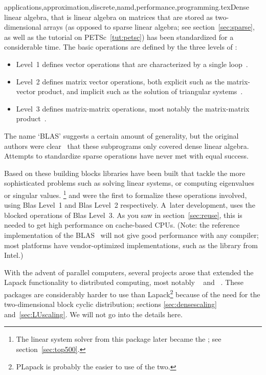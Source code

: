 {applications,approximation,discrete,namd,performance,programming}.texDense linear algebra, that is linear algebra on matrices that are
stored as two-dimensional arrays (as opposed to sparse linear algebra;
see section~\ref{sec:sparse}, as well as the
tutorial on PETSc~\ref{tut:petsc}) has been standardized for a
considerable time. The basic operations are defined by the three
levels of :
\begin{itemize}
\item Level~1 defines vector operations that are characterized by a
  single loop~\cite{Lawson:blas}.
\item Level~2 defines matrix vector operations, both explicit such as
  the matrix-vector product, and implicit such as the solution of
  triangular systems~\cite{BLAS2}.
\item Level~3 defines matrix-matrix operations, most notably the
  matrix-matrix product~\cite{BLAS3}.
\end{itemize}
The name `BLAS' suggests a certain amount of generality, but the
original authors were clear~\cite{Lawson:blas} that these subprograms
only covered dense linear algebra. Attempts to standardize sparse
operations have never met with equal success.

Based on these building blocks libraries have been built that tackle
the more sophisticated problems such as solving linear systems, or
computing eigenvalues or singular values.
\footnote{The linear system solver from this
  package later became the ; see
  section~\ref{sec:top500}.} and  were the first to formalize
these operations involved, using Blas Level~1 and Blas Level~2
respectively.  A~later development,  uses the
blocked operations of Blas Level~3. As you saw in
section~\ref{sec:reuse}, this is needed to get high performance on
cache-based CPUs. (Note: the reference implementation of the
BLAS~\cite{reference-blas} will not give good performance with any
compiler; most platforms have vendor-optimized implementations, such
as the  library from Intel.)

With the advent of parallel computers, several projects arose that
extended the Lapack functionality to distributed computing, most
notably ~\cite{scalapack} and
~\cite{PLAPACK,PLAPACK:UG}. These packages are
considerably harder to use than Lapack\footnote{PLapack is probably
  the easier to use of the two.} because of the need for the
two-dimensional block cyclic distribution; sections
\ref{sec:densescaling} and~\ref{sec:LUscaling}. We will not go into
the details here.

